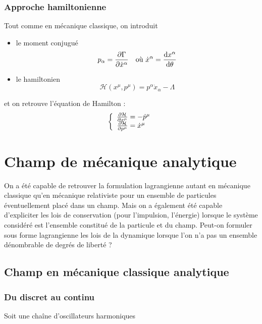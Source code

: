 \subsubsection{Approche hamiltonienne}
Tout comme en mécanique classique, on introduit 
\begin{itemize}
	\item le moment conjugué
	$$
		p_{\alpha}=\frac{\partial\Gamma}{\partial\dot{x}^{\alpha}}\text{\hspace{10pt}où 	}\dot{x}^{\alpha}=\frac{\mathrm{d} x^{\alpha}}{\mathrm{d}\theta}
	$$
	\item le hamiltonien
	$$
		\mathcal{H}(x^\mu,p^\mu)=p^{\alpha}\dot{x}_{\alpha}-\Lambda
	$$
\end{itemize}
et on retrouve l'équation de Hamilton :
$$
	\left\{ \begin{array}{r@{\;}l}
		\frac{\partial\mathcal{H}}{\partial x^\mu}&=-\dot{p}^\mu\\
		\frac{\partial\mathcal{H}}{\partial p^\mu}&=\dot{x}^\mu\\
	\end{array} \right.
$$


\section{Champ de mécanique analytique}
On a été capable de retrouver la formulation lagrangienne autant en mécanique classique qu'en mécanique relativiste pour un ensemble de particules éventuellement placé dans un champ. Mais on a également été capable d'expliciter les lois de conservation (pour l'impulsion, l'énergie) lorsque le système considéré est l'ensemble constitué de la particule et du champ. Peut-on formuler sous forme lagrangienne les lois de la dynamique lorsque l'on n'a pas un ensemble dénombrable de degrés de liberté ?

\subsection{Champ en mécanique classique analytique}
\subsubsection{Du discret au continu}

Soit une cha\^ine d'oscillateurs harmoniques


